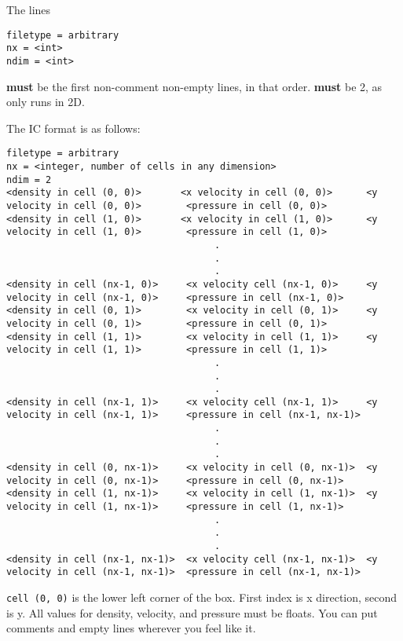 The lines

\begin{lstlisting}
filetype = arbitrary
nx = <int>
ndim = <int>
\end{lstlisting}

\textbf{must} be the first non-comment non-empty lines, in that order.
 \textbf{must} be 2, as \hydro only runs
in 2D.

The IC format is as follows:

\begin{lstlisting}
filetype = arbitrary
nx = <integer, number of cells in any dimension>
ndim = 2
<density in cell (0, 0)>       <x velocity in cell (0, 0)>      <y velocity in cell (0, 0)>        <pressure in cell (0, 0)>
<density in cell (1, 0)>       <x velocity in cell (1, 0)>      <y velocity in cell (1, 0)>        <pressure in cell (1, 0)>
                                     .
                                     .
                                     .
<density in cell (nx-1, 0)>     <x velocity cell (nx-1, 0)>     <y velocity in cell (nx-1, 0)>     <pressure in cell (nx-1, 0)>
<density in cell (0, 1)>        <x velocity in cell (0, 1)>     <y velocity in cell (0, 1)>        <pressure in cell (0, 1)>
<density in cell (1, 1)>        <x velocity in cell (1, 1)>     <y velocity in cell (1, 1)>        <pressure in cell (1, 1)>
                                     .
                                     .
                                     .
<density in cell (nx-1, 1)>     <x velocity cell (nx-1, 1)>     <y velocity in cell (nx-1, 1)>     <pressure in cell (nx-1, nx-1)>
                                     .
                                     .
                                     .
<density in cell (0, nx-1)>     <x velocity in cell (0, nx-1)>  <y velocity in cell (0, nx-1)>     <pressure in cell (0, nx-1)>
<density in cell (1, nx-1)>     <x velocity in cell (1, nx-1)>  <y velocity in cell (1, nx-1)>     <pressure in cell (1, nx-1)>
                                     .
                                     .
                                     .
<density in cell (nx-1, nx-1)>  <x velocity cell (nx-1, nx-1)>  <y velocity in cell (nx-1, nx-1)>  <pressure in cell (nx-1, nx-1)>
\end{lstlisting}

\texttt{cell\ (0,\ 0)} is the lower left corner of the box. First index is x
direction, second is y. All values for density, velocity, and pressure must be
floats. You can put comments and empty lines wherever you feel like it.











